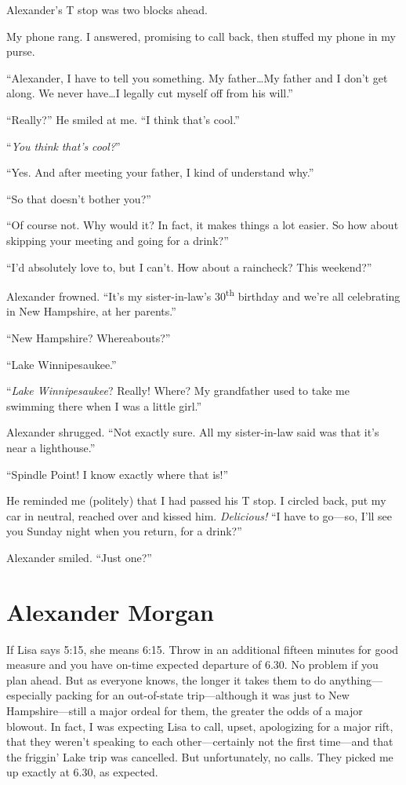 Alexander's T stop was two blocks ahead.

My phone rang. I answered, promising to call back, then stuffed my phone
in my purse.

``Alexander, I have to tell you something. My father\ldots My father and
I don't get along. We never have\ldots I legally cut myself off from his
will.''

``Really?'' He smiled at me. ``I think that's cool.''

``\emph{You think} \emph{that's} \emph{cool?}''

``Yes. And after meeting your father, I kind of understand why.''

``So that doesn't bother you?''

``Of course not. Why would it? In fact, it makes things a lot easier. So
how about skipping your meeting and going for a drink?''

``I'd absolutely love to, but I can't. How about a raincheck? This
weekend?''

Alexander frowned. ``It's my sister-in-law's 30\textsuperscript{th}
birthday and we're all celebrating in New Hampshire, at her parents.''

``New Hampshire? Whereabouts?''

``Lake Winnipesaukee.''

``\emph{Lake Winnipesaukee}? Really! Where? My grandfather used to take
me swimming there when I was a little girl.''

Alexander shrugged. ``Not exactly sure. All my sister-in-law said was
that it's near a lighthouse.''

``Spindle Point! I know exactly where that is!''

He reminded me (politely) that I had passed his T stop. I circled back,
put my car in neutral, reached over and kissed him. \emph{Delicious!}
``I have to go---so, I'll see you Sunday night when you return, for a
drink?''

Alexander smiled. ``Just one?''

\chapter{Alexander Morgan}

\titlemark

If Lisa says 5:15, she means 6:15. Throw in an additional fifteen
minutes for good measure and you have on-time expected departure of
6.30. No problem if you plan ahead. But as everyone knows, the longer it
takes them to do anything---especially packing for an out-of-state
trip---although it was just to New Hampshire---still a major ordeal for
them, the greater the odds of a major blowout. In fact, I was expecting
Lisa to call, upset, apologizing for a major rift, that they weren't
speaking to each other---certainly not the first time---and that the
friggin' Lake trip was cancelled. But unfortunately, no calls. They
picked me up exactly at 6.30, as expected.

